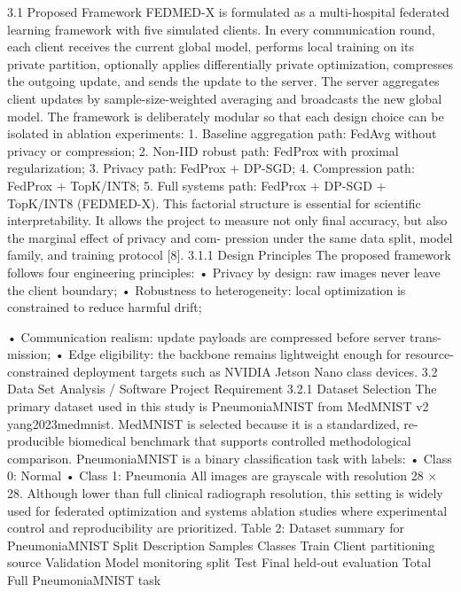 3.1
Proposed Framework
FEDMED-X is formulated as a multi-hospital federated learning framework with five simulated clients. In every communication round, each client receives the current global model, performs local training on its private partition, optionally applies differentially private optimization, compresses the outgoing update, and sends the update to the server. The server aggregates client updates by sample-size-weighted averaging and broadcasts the new global model.
The framework is deliberately modular so that each design choice can be isolated in ablation experiments:
1. Baseline aggregation path: FedAvg without privacy or compression; 2. Non-IID robust path: FedProx with proximal regularization; 3. Privacy path: FedProx + DP-SGD; 4. Compression path: FedProx + TopK/INT8; 5. Full systems path: FedProx + DP-SGD + TopK/INT8 (FEDMED-X).
This factorial structure is essential for scientific interpretability. It allows the project to measure not only final accuracy, but also the marginal effect of privacy and com- pression under the same data split, model family, and training protocol [8].
3.1.1
Design Principles
The proposed framework follows four engineering principles:
• Privacy by design: raw images never leave the client boundary;
• Robustness to heterogeneity: local optimization is constrained to reduce harmful drift;

• Communication realism: update payloads are compressed before server trans- mission;
• Edge eligibility: the backbone remains lightweight enough for resource-constrained deployment targets such as NVIDIA Jetson Nano class devices.
3.2
Data Set Analysis / Software Project Requirement 3.2.1
Dataset Selection
The primary dataset used in this study is PneumoniaMNIST from MedMNIST v2 yang2023medmnist.
MedMNIST is selected because it is a standardized, re- producible biomedical benchmark that supports controlled methodological comparison.
PneumoniaMNIST is a binary classification task with labels:
• Class 0: Normal
• Class 1: Pneumonia
All images are grayscale with resolution 28 × 28. Although lower than full clinical radiograph resolution, this setting is widely used for federated optimization and systems ablation studies where experimental control and reproducibility are prioritized.
Table 2: Dataset summary for PneumoniaMNIST
Split
Description
Samples
Classes
Train
Client partitioning source
Validation
Model monitoring split
Test
Final held-out evaluation
Total
Full PneumoniaMNIST task

